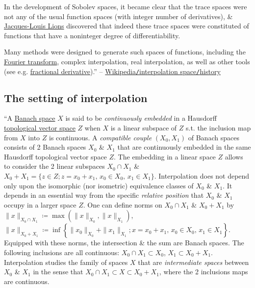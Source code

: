 \documentclass[oneside]{book}
\numberwithin{equation}{section}
\begin{document}
In the development of Sobolev spaces, it became clear that the trace spaces were not any of the usual function spaces (with integer number of derivatives), \& \href{https://en.wikipedia.org/wiki/Jacques-Louis_Lions}{Jacques-Louis Lions} discovered that indeed these trace spaces were constituted of functions that have a noninteger degree of differentiability.

Many methods were designed to generate such spaces of functions, including the \href{https://en.wikipedia.org/wiki/Fourier_transform}{Fourier transform}, complex interpolation, real interpolation, as well as other tools (see e.g. \href{https://en.wikipedia.org/wiki/Fractional_derivative}{fractional derivative}).'' -- \href{https://en.wikipedia.org/wiki/Interpolation_space#History}{Wikipedia\texttt{/}interpolation space\texttt{/}history}

\subsection{The setting of interpolation}
``A \href{https://en.wikipedia.org/wiki/Banach_space}{Banach space} $X$ is said to be \textit{continuously embedded} in a Hausdorff \href{https://en.wikipedia.org/wiki/Topological_vector_space}{topological vector space} $Z$ when $X$ is a linear subspace of $Z$ s.t. the inclusion map from $X$ into $Z$ is continuous. A \textit{compatible couple} $(X_0,X_1)$ of Banach spaces consists of 2 Banach spaces $X_0$ \& $X_1$ that are continuously embedded in the same Hausdorff topological vector space $Z$. The embedding in a linear space $Z$ allows to consider the 2 linear subspaces $X_0\cap X_1$ \& $X_0 + X_1 = \{z\in Z;z = x_0 + x_1,\,x_0\in X_0,\,x_1\in X_1\}$. Interpolation does not depend only upon the isomorphic (nor isometric) equivalence classes of $X_0$ \& $X_1$. It depends in an essential way from the specific \textit{relative position} that $X_0$ \& $X_1$ occupy in a larger space $Z$. One can define norms on $X_0\cap X_1$ \& $X_0 + X_1$ by $\|x\|_{X_0\cap X_1}\coloneqq\max\left(\|x\|_{X_0},\|x\|_{X_1}\right)$, $\|x\|_{X_0 + X_1}\coloneqq\inf\left\{\|x_0\|_{X_0} + \|x_1\|_{X_1};x = x_0 + x_1,\,x_0\in X_0,\,x_1\in X_1\right\}$. Equipped with these norms, the intersection \& the sum are Banach spaces. The following inclusions are all continuous: $X_0\cap X_1\subset X_0$, $X_1\subset X_0 + X_1$. Interpolation studies the family of spaces $X$ that are \textit{intermediate spaces} between $X_0$ \& $X_1$ in the sense that $X_0\cap X_1\subset X\subset X_0 + X_1$, where the 2 inclusions maps are continuous.
\end{document}
